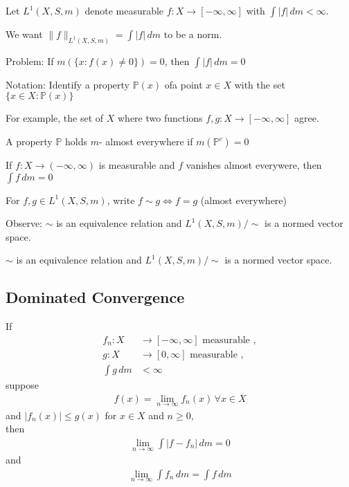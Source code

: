 Let $L^{1}(X,S, m)$ denote measurable $f: X \to [-\infty, \infty]$ with $\int | f| \, dm < \infty$.

We want $\|f\|_{L^{1}(X,S, m)} = \int |f| \, dm$ to be a norm.

Problem: If $m(\{x : f(x) \neq 0 \}) = 0$, then $\int |f| \, dm = 0$

\begin{remark}
	Notation: Identify a property $\mathbb{P}(x)$ ofa point $x \in X$ with the set $\{x \in X : \mathbb{P}(x)\}$
\end{remark}

For example, the set of $X$ where two functions  $f,g : X \to [-\infty, \infty]$ agree.

A property $\mathbb{P}$ holds $m$- almost everywhere if $m(\mathbb{P}^{c}) = 0$

\begin{example}
	If $f : X \to (-\infty, \infty)$ is measurable and $f$ vanishes almost everywere, then $\int f \, dm = 0$
\end{example}


For $f,g \in L^{1}(X,S, m)$, write $f \sim g \iff f=g$ (almost everywhere)

Observe: $\sim$ is an equivalence relation and $L^{1}(X,S, m) / \sim$ is a normed vector space.

\begin{observation}
  $\sim$ is an equivalence relation and $L^{1}(X,S, m) / \sim$ is a normed vector space.
\end{observation}

\subsection{Dominated Convergence}

\begin{definition}
	If
	\begin{align*}
		f_n : X &\to [-\infty, \infty] \text{ measurable }, \\
		g : X &\to [0, \infty] \text{ measurable }, \\
		\int g \, dm &< \infty
	\end{align*}
	suppose
	\begin{align*}
		f(x) = \lim_{n \to \infty} f_n(x)\, \forall x \in X
	\end{align*}
	and $|f_n (x) | \leq g(x)$ for $x \in X$ and $n \geq 0,$ \\
	then
	\begin{align}
		\lim_{n\to \infty} \int | f - f_n | \, dm = 0
	\end{align}
	and \\
	\begin{align*}
		\lim_{n\to \infty} \int f_n \, dm = \int f \, dm
	\end{align*}

\end{definition}

